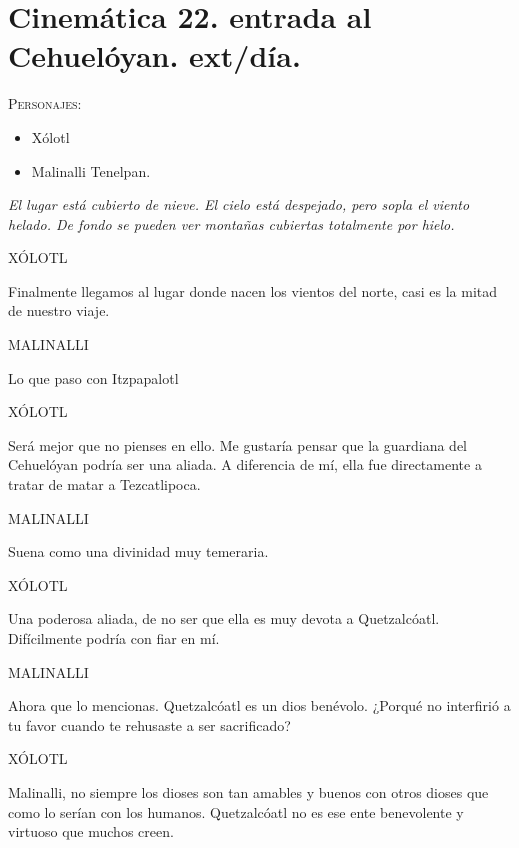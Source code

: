 \documentclass[11pt,letterpaper]{article}
\begin{document}
\section{Cinemática 22. entrada al Cehuelóyan. ext/día.}
\textsc{Personajes}:
\begin{itemize}
\item Xólotl
\item Malinalli Tenelpan.
\end{itemize}
\textit{El lugar está cubierto de nieve. El cielo está despejado, pero sopla el viento helado. De fondo se pueden ver montañas cubiertas totalmente por hielo.}
\begin{center}
XÓLOTL
\\
\par
Finalmente llegamos al lugar donde nacen los vientos del norte, casi es la mitad de nuestro viaje.
\\
\par
MALINALLI
\\
\par
Lo que paso con Itzpapalotl
\\
\par
XÓLOTL
\\
\par
Será mejor que no pienses en ello. Me gustaría pensar que la guardiana del Cehuelóyan podría ser una aliada. A diferencia de mí, ella fue directamente a tratar de matar a Tezcatlipoca.
\\
\par
MALINALLI
\\
\par
Suena como una divinidad muy temeraria.
\\
\par
XÓLOTL
\\
\par
Una poderosa aliada, de no ser que ella es muy devota a Quetzalcóatl. Difícilmente podría con fiar en mí.
\\
\par
MALINALLI
\\
\par
Ahora que lo mencionas. Quetzalcóatl es un dios benévolo. ¿Porqué no interfirió a tu favor cuando te rehusaste a ser sacrificado? 
\\
\par
XÓLOTL
\\
\par
Malinalli, no siempre los dioses son tan amables y buenos con otros dioses que como lo serían con los humanos. Quetzalcóatl no es ese ente benevolente y virtuoso que muchos creen. 
\end{center}
\end{document}
